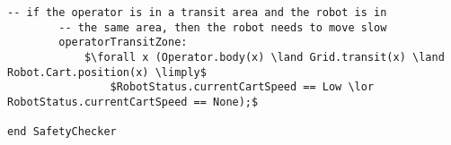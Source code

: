 \begin{lstlisting}[fontadjust, mathescape, frame=single]
        -- if the operator is in a transit area and the robot is in
        -- the same area, then the robot needs to move slow
        operatorTransitZone:
            $\forall x (Operator.body(x) \land Grid.transit(x) \land Robot.Cart.position(x) \limply$
                $RobotStatus.currentCartSpeed == Low \lor RobotStatus.currentCartSpeed == None);$

end SafetyChecker                
\end{lstlisting}